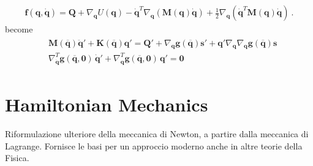 \documentclass[letterpaper,10pt,english]{jupyterBook}
\begin{document}
\begin{equation*}
\begin{split}\mathbf{f}(\mathbf{q}, \dot{\mathbf{q}}) = \mathbf{Q} + \nabla_{\mathbf{q}} U(\mathbf{q}) - \dot{\mathbf{q}}^T \nabla_{\mathbf{q}} \left( \mathbf{M}(\mathbf{q}) \dot{\mathbf{q}} \right) + \frac{1}{2} \nabla_{\mathbf{q}} \left( \dot{\mathbf{q}}^T \mathbf{M}(\mathbf{q}) \dot{\mathbf{q}} \right) \ .\end{split}
\end{equation*}
\sphinxAtStartPar
{} become
\begin{equation*}
\begin{split}\begin{aligned}
 & \mathbf{M}(\overline{\mathbf{q}}) \ddot{\mathbf{q}}' + \mathbf{K}(\overline{\mathbf{q}}) \mathbf{q}' = \mathbf{Q}' + \nabla_{\mathbf{q}} \mathbf{g}(\overline{\mathbf{q}}) \mathbf{s}' + \mathbf{q}' \nabla_{\mathbf{q}} \nabla_{\mathbf{q}} \mathbf{g}(\overline{\mathbf{q}}) \mathbf{s} \\
 & \nabla_{\dot{\mathbf{q}}}^T \mathbf{g}(\overline{\mathbf{q}}, \mathbf{0}) \, \dot{\mathbf{q}}' + \nabla_{\mathbf{q}}^T \mathbf{g}(\overline{\mathbf{q}}, \mathbf{0}) \, \mathbf{q}' = \mathbf{0}
\end{aligned}\end{split}
\end{equation*}
\sphinxstepscope




\chapter{Hamiltonian Mechanics}
\label{\detokenize{ch/hamilton:hamiltonian-mechanics}}\label{\detokenize{ch/hamilton:classical-mechanics-hamilton}}\label{\detokenize{ch/hamilton::doc}}
\sphinxAtStartPar
Riformulazione ulteriore della meccanica di Newton, a partire dalla meccanica di Lagrange.
Fornisce le basi per un approccio moderno anche in altre teorie della Fisica. 
\end{document}
